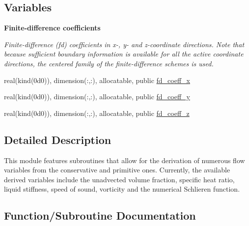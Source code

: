 \subsection*{Variables}
\begin{Indent}\textbf{ Finite-\/difference coefficients}\par
{\em Finite-\/difference (fd) coefficients in x-\/, y-\/ and z-\/coordinate directions. Note that because sufficient boundary information is available for all the active coordinate directions, the centered family of the finite-\/difference schemes is used. }\begin{DoxyCompactItemize}
\item 
real(kind(0d0)), dimension(\+:,\+:), allocatable, public \hyperlink{namespacem__derived__variables_a4f61d6bef7f53e49a0f5e4a3f9577912}{fd\+\_\+coeff\+\_\+x}
\item 
real(kind(0d0)), dimension(\+:,\+:), allocatable, public \hyperlink{namespacem__derived__variables_ab273055cd131e3ce73c1f468b78af7b7}{fd\+\_\+coeff\+\_\+y}
\item 
real(kind(0d0)), dimension(\+:,\+:), allocatable, public \hyperlink{namespacem__derived__variables_a3cafc9204d5773653e119ce3a3b98722}{fd\+\_\+coeff\+\_\+z}
\end{DoxyCompactItemize}
\end{Indent}


\subsection{Detailed Description}
This module features subroutines that allow for the derivation of numerous flow variables from the conservative and primitive ones. Currently, the available derived variables include the unadvected volume fraction, specific heat ratio, liquid stiffness, speed of sound, vorticity and the numerical Schlieren function. 

\subsection{Function/\+Subroutine Documentation}
\mbox{\label{namespacem__derived__variables_a516a9808b3446b7b45029f6451d02b3f}} 
